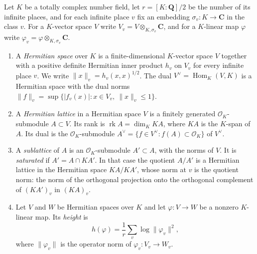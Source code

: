 \begin{definition}\label{hs-hermitian-lattice}
Let $K$ be a totally complex number field, let $r=[K:\mathbf Q]/2$ be the number of its infinite
places, and for each infinite place $v$ fix an embedding $\sigma_v:K\to\mathbf C$ in the class
$v$. For a $K$-vector space $V$ write $V_v=V\otimes_{K,\sigma_v}\mathbf C$, and for a $K$-linear
map $\varphi$ write $\varphi_v=\varphi\otimes_{K,\sigma_v}\mathbf C$.
\begin{enumerate}
\item A \emph{Hermitian space} over $K$ is a finite-dimensional $K$-vector space $V$ together
  with a positive definite Hermitian inner product $h_v$ on $V_v$ for every infinite place $v$.
  We write $\|x\|_v=h_v(x,x)^{1/2}$. The dual $V^\vee=\operatorname{Hom}_K(V,K)$ is a Hermitian
  space with the dual norms $\|f\|_v=\sup\{|f_v(x)|:x\in V_v,\ \|x\|_v\leq1\}$.
\item A \emph{Hermitian lattice} in a Hermitian space $V$ is a finitely generated
  $\mathcal O_K$-submodule $A\subset V$. Its rank is $\operatorname{rk}A=\dim_K KA$, where $KA$
  is the $K$-span of $A$. Its dual is the $\mathcal O_K$-submodule
  $A^\vee=\{f\in V^\vee: f(A)\subset\mathcal O_K\}$ of $V^\vee$.
\item A \emph{sublattice} of $A$ is an $\mathcal O_K$-submodule $A'\subset A$, with the norms
  of $V$. It is \emph{saturated} if $A'=A\cap KA'$. In that case the quotient $A/A'$ is a
  Hermitian lattice in the Hermitian space $KA/KA'$, whose norm at $v$ is the quotient norm:
  the norm of the orthogonal projection onto the orthogonal complement of $(KA')_v$ in $(KA)_v$.
\item Let $V$ and $W$ be Hermitian spaces over $K$ and let $\varphi:V\to W$ be a nonzero
  $K$-linear map. Its \emph{height} is
  \[
   h(\varphi)=\frac1r\sum_v\log\|\varphi_v\|^2,
  \]
  where $\|\varphi_v\|$ is the operator norm of $\varphi_v:V_v\to W_v$.
\end{enumerate}
\end{definition}

